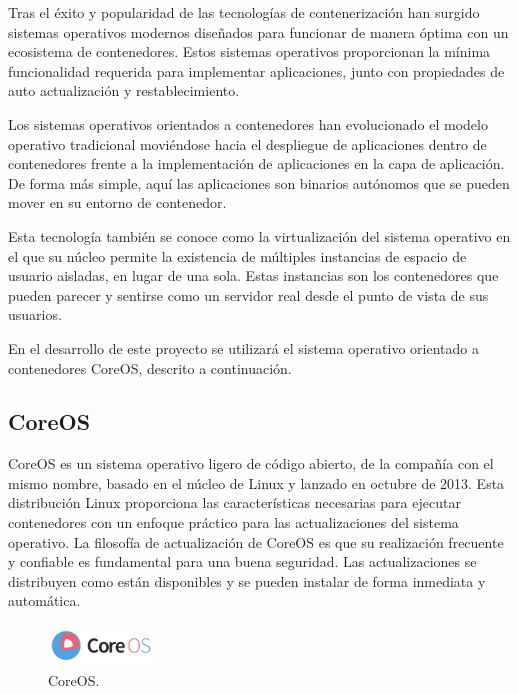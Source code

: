 Tras el éxito y popularidad de las tecnologías de contenerización han surgido sistemas operativos modernos diseñados para funcionar de manera óptima con un ecosistema de contenedores. Estos sistemas operativos proporcionan la mínima funcionalidad requerida para implementar aplicaciones, junto con propiedades de auto actualización y restablecimiento.

Los sistemas operativos orientados a contenedores han evolucionado el modelo operativo tradicional moviéndose hacia el despliegue de aplicaciones dentro de contenedores frente a la implementación de aplicaciones en la capa de aplicación. De forma más simple, aquí las aplicaciones son binarios autónomos que se pueden mover en su entorno de contenedor.

Esta tecnología también se conoce como la virtualización del sistema operativo en el que su núcleo permite la existencia de múltiples instancias de espacio de usuario aisladas, en lugar de una sola. Estas instancias son los contenedores que pueden parecer y sentirse como un servidor real desde el punto de vista de sus usuarios.

En el desarrollo de este proyecto se utilizará el sistema operativo orientado a contenedores CoreOS, descrito a continuación.

\subsection{CoreOS}

CoreOS es un sistema operativo ligero de código abierto, de la compañía con el mismo nombre, basado en el núcleo de Linux y lanzado en octubre de 2013. Esta distribución Linux proporciona las características necesarias para ejecutar contenedores con un enfoque práctico para las actualizaciones del sistema operativo. La filosofía de actualización de CoreOS es que su realización frecuente y confiable es fundamental para una buena seguridad. Las actualizaciones se distribuyen como están disponibles y se pueden instalar de forma inmediata y automática.

\begin{figure}[H]
\centering
\includegraphics[width=0.25\textwidth]{images/figures/coreos.png}
\caption{CoreOS.\label{fig:figure_placement_example}}
\end{figure}

